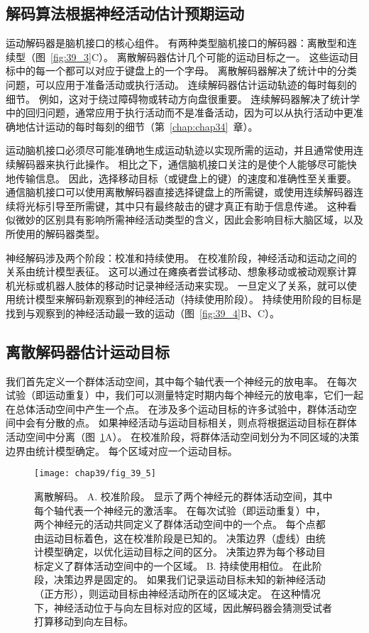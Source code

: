 \subsection{解码算法根据神经活动估计预期运动}

运动解码器是脑机接口的核心组件。 
有两种类型脑机接口的解码器：离散型和连续型（图~\ref{fig:39_3}C）。
离散解码器估计几个可能的运动目标之一。
这些运动目标中的每一个都可以对应于键盘上的一个字母。
离散解码器解决了统计中的分类问题，可以应用于准备活动或执行活动。
连续解码器估计运动轨迹的每时每刻的细节。
例如，这对于绕过障碍物或转动方向盘很重要。
连续解码器解决了统计学中的回归问题，通常应用于执行活动而不是准备活动，因为可以从执行活动中更准确地估计运动的每时每刻的细节（第~\ref{chap:chap34}~章）。


运动脑机接口必须尽可能准确地生成运动轨迹以实现所需的运动，并且通常使用连续解码器来执行此操作。
相比之下，通信脑机接口关注的是使个人能够尽可能快地传输信息。
因此，选择移动目标（或键盘上的键）的速度和准确性至关重要。
通信脑机接口可以使用离散解码器直接选择键盘上的所需键，或使用连续解码器连续将光标引导至所需键，其中只有最终敲击的键才真正有助于信息传递。
这种看似微妙的区别具有影响所需神经活动类型的含义，因此会影响目标大脑区域，以及所使用的解码器类型。


神经解码涉及两个阶段：校准和持续使用。
在校准阶段，神经活动和运动之间的关系由统计模型表征。
这可以通过在瘫痪者尝试移动、想象移动或被动观察计算机光标或机器人肢体的移动时记录神经活动来实现。
一旦定义了关系，就可以使用统计模型来解码新观察到的神经活动（持续使用阶段）。
持续使用阶段的目标是找到与观察到的神经活动最一致的运动（图~\ref{fig:39_4}B、C）。



\subsection{离散解码器估计运动目标}

我们首先定义一个群体活动空间，其中每个轴代表一个神经元的放电率。
在每次试验（即运动重复）中，我们可以测量特定时期内每个神经元的放电率，它们一起在总体活动空间中产生一个点。
在涉及多个运动目标的许多试验中，群体活动空间中会有分散的点。
如果神经活动与运动目标相关，则点将根据运动目标在群体活动空间中分离（图~\ref{fig:39_5}A）。
在校准阶段，将群体活动空间划分为不同区域的决策边界由统计模型确定。
每个区域对应一个运动目标。


\begin{figure}[htbp]
	\centering
	\texttt{[image: chap39/fig\_39\_5]}
	\caption{离散解码。
		A. 校准阶段。
		显示了两个神经元的群体活动空间，其中每个轴代表一个神经元的激活率。
		在每次试验（即运动重复）中，两个神经元的活动共同定义了群体活动空间中的一个点。
		每个点都由运动目标着色，这在校准阶段是已知的。 
		决策边界（虚线）由统计模型确定，以优化运动目标之间的区分。
		决策边界为每个移动目标定义了群体活动空间中的一个区域。
		B. 持续使用相位。
		在此阶段，决策边界是固定的。
		如果我们记录运动目标未知的新神经活动（正方形），则运动目标由神经活动所在的区域决定。
		在这种情况下，神经活动位于与向左目标对应的区域，因此解码器会猜测受试者打算移动到向左目标。}
	\label{fig:39_5}
\end{figure}



